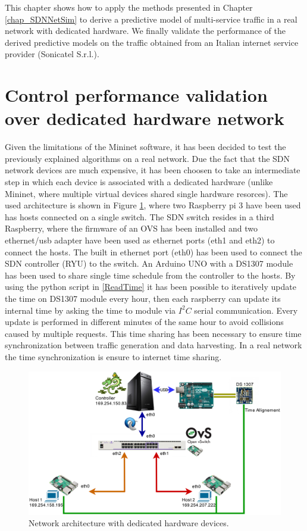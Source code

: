 This chapter shows how to apply the methods presented in Chapter \ref{chap_SDNNetSim} to derive a predictive model of multi-service traffic in a real network with dedicated hardware. We finally validate the performance of the derived predictive models on the traffic obtained from an Italian internet service provider (Sonicatel S.r.l.).
\section{Control performance validation over dedicated hardware network}
Given the limitations of the Mininet software, it has been decided to test the previously explained algorithms on a real network. Due the fact that the SDN network devices are much expensive, it has been choosen to take an intermediate step in which each device is associated with a dedicated hardware (unlike Mininet, where multiple virtual devices shared single hardware resorces). The used architecture is shown in Figure \ref{fig:{Real_NET}}, where two Raspberry pi 3 \cite{rasp} have been used has hosts connected on a single switch. The SDN switch resides in a third Raspberry, where the firmware of an OVS has been installed and two ethernet/usb adapter have been used as ethernet ports (eth1 and eth2) to connect the hosts. The built in ethernet port (eth0) has been used to connect the SDN controller (RYU) to the switch. An Arduino UNO with a DS1307 module has been used to share single time schedule from the controller to the hosts. By using the python script in \ref{ReadTime}  it has been possible to iteratively update the time on DS1307 module every hour, then each raspberry can update its internal time by asking the time to module via $I^{2}C$ serial communication. Every update is performed in different minutes of the same hour to avoid collisions caused by multiple requests. This time sharing has been necessary to ensure time synchronization between traffic generation and data harvesting. In a real network the time synchronization is ensure to internet time sharing.
\begin{figure}[tb!]
	\centering
	\includegraphics[width=13cm]{figure/Real_NET.png}
	\caption{Network architecture with dedicated hardware devices.}
	\label{fig:{Real_NET}}
\end{figure}
